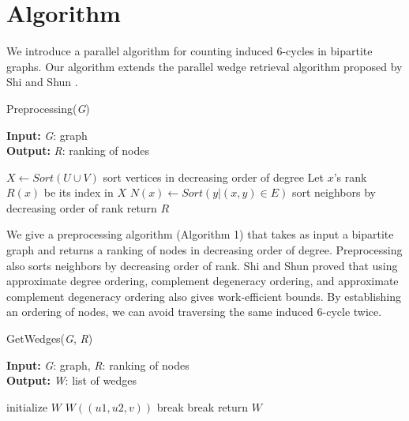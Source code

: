 \documentclass[11pt]{article}
\begin{document}
\section{Algorithm}

We introduce a parallel algorithm for counting induced 6-cycles in bipartite graphs.
Our algorithm extends the parallel wedge retrieval algorithm proposed by Shi and Shun \cite{shi2019parallel}.

\begin{algorithm}[H]
\caption{Preprocessing(\textit{G})}
\hspace*{\algorithmicindent} \textbf{Input:} \textit{G}: graph \\
\hspace*{\algorithmicindent} \textbf{Output:} \textit{R}: ranking of nodes
\begin{algorithmic}[1]
    \State $X \gets Sort(U \cup V)$ \Comment sort vertices in decreasing order of degree
    \State Let $x$'s rank $R(x)$ be its index in $X$
        \State $N(x) \gets Sort({y | (x, y) \in E})$ \Comment sort neighbors by decreasing order of rank
    \EndFor
    \State return $R$
\end{algorithmic}
\end{algorithm}

We give a preprocessing algorithm (Algorithm 1) that takes as input a bipartite graph and returns a ranking of nodes in decreasing order of degree.
Preprocessing also sorts neighbors by decreasing order of rank.
Shi and Shun \cite{shi2019parallel} proved that using approximate degree ordering, complement degeneracy ordering, and approximate complement degeneracy ordering also gives work-efficient bounds.
By establishing an ordering of nodes, we can avoid traversing the same induced 6-cycle twice.

\begin{algorithm}[H]
\caption{GetWedges(\textit{G}, \textit{R})}
\hspace*{\algorithmicindent} \textbf{Input:} \textit{G}: graph, \textit{R}: ranking of nodes \\
\hspace*{\algorithmicindent} \textbf{Output:} \textit{W}: list of wedges
\begin{algorithmic}[1]
    \State initialize $W$
                        \State $W((u1, u2, v))$
                    \Else
                        \State break
                    \EndIf
                \EndFor
            \Else
                \State break
            \EndIf
        \EndFor
    \EndFor
    \State return $W$
\end{algorithmic}
\end{algorithm}
\end{document}
